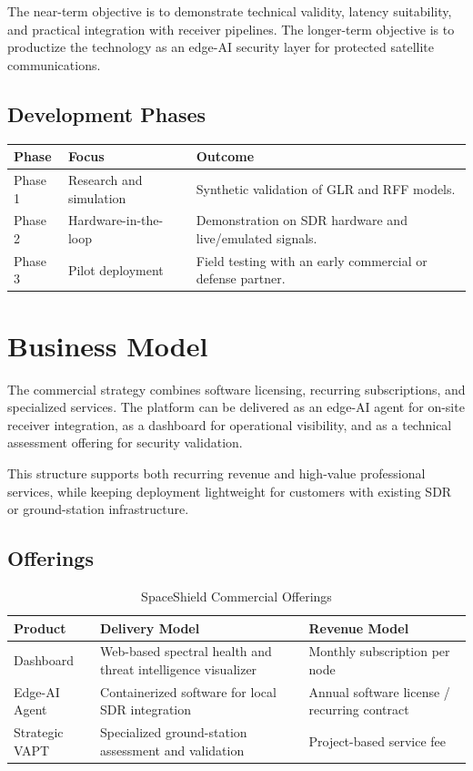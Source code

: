 \documentclass[11pt,a4paper]{article}
\begin{document}
The near-term objective is to demonstrate technical validity, latency suitability, and practical integration with receiver pipelines. The longer-term objective is to productize the technology as an edge-AI security layer for protected satellite communications.

\subsection{Development Phases}

\begin{longtable}{p{}p{}p{}}
\toprule
\textbf{Phase} & \textbf{Focus} & \textbf{Outcome} \\
\midrule
Phase 1 & Research and simulation & Synthetic validation of GLR and RFF models. \\
Phase 2 & Hardware-in-the-loop & Demonstration on SDR hardware and live/emulated signals. \\
Phase 3 & Pilot deployment & Field testing with an early commercial or defense partner. \\
\bottomrule
\end{longtable}

\section{Business Model}

The commercial strategy combines software licensing, recurring subscriptions, and specialized services. The platform can be delivered as an edge-AI agent for on-site receiver integration, as a dashboard for operational visibility, and as a technical assessment offering for security validation.

This structure supports both recurring revenue and high-value professional services, while keeping deployment lightweight for customers with existing SDR or ground-station infrastructure.

\subsection{Offerings}

\begin{table}[H]
\centering
\caption{SpaceShield Commercial Offerings}
\begin{tabularx}{\textwidth}{@{}p{}p{}p{}@{}}
\toprule
\textbf{Product} & \textbf{Delivery Model} & \textbf{Revenue Model} \\
\midrule
Dashboard & Web-based spectral health and threat intelligence visualizer & Monthly subscription per node \\
Edge-AI Agent & Containerized software for local SDR integration & Annual software license / recurring contract \\
Strategic VAPT & Specialized ground-station assessment and validation & Project-based service fee \\
\bottomrule
\end{tabularx}
\end{table}
\end{document}
